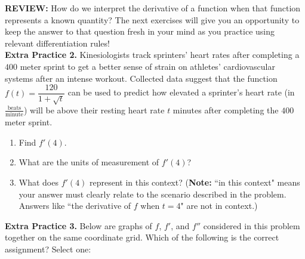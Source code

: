 \documentclass[10pt]{article}
\begin{document}
\vfill


{\bf REVIEW:} How do we interpret the derivative of a function when that function represents a known quantity? The next  exercises will give you an opportunity to keep the answer to that question fresh in your mind as you practice using relevant differentiation rules!\\

{\bf\color{blue}Extra Practice 2.}%
 Kinesiologists track sprinters' heart rates after completing a $400$ meter sprint to get a better sense of strain on athletes' cardiovascular systems after an intense workout. Collected data suggest that the function $f(t)=\dfrac{120}{1+\sqrt{t}}$ can be used to predict how elevated a sprinter's heart rate (in $\frac{\text{beats}}{\text{minute}}$) will be above their resting heart rate $t$ minutes after completing the $400$ meter sprint.


\begin{enumerate}


\item[(a)] Find $f'(4)$. 

\vfill
\vfill

\item[(b)] What are the units of measurement of $f'(4)$? 

\item[(c)] What does $f'(4)$ represent in this context? ({\bf Note:} ``in this context" means your answer must clearly relate to the scenario described in the problem. Answers like ``the derivative of $f$ when $t=4$" are not in context.)

\vfill
\end{enumerate}
{\bf\color{blue}Extra Practice 3.} Below are graphs of $f$, $f'$, and $f''$ considered in this problem together on the same coordinate grid. Which of the following is the correct assignment? Select one:\\
\end{document}
